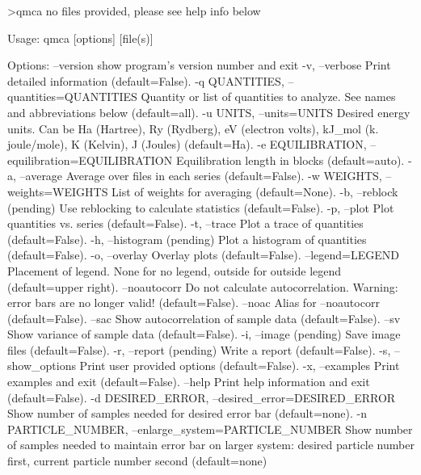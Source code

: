\begin{shade}
>qmca
  no files provided, please see help info below 
  
  Usage: qmca [options] [file(s)]
  
  Options:
    --version             show program's version number and exit
    -v, --verbose         Print detailed information (default=False).
    -q QUANTITIES, --quantities=QUANTITIES
                          Quantity or list of quantities to analyze.  See names
                          and abbreviations below (default=all).
    -u UNITS, --units=UNITS
                          Desired energy units.  Can be Ha (Hartree), Ry
                          (Rydberg), eV (electron volts), kJ_mol (k.
                          joule/mole), K (Kelvin), J (Joules) (default=Ha).
    -e EQUILIBRATION, --equilibration=EQUILIBRATION
                          Equilibration length in blocks (default=auto).
    -a, --average         Average over files in each series (default=False).
    -w WEIGHTS, --weights=WEIGHTS
                          List of weights for averaging (default=None).
    -b, --reblock         (pending) Use reblocking to calculate statistics
                          (default=False).
    -p, --plot            Plot quantities vs. series (default=False).
    -t, --trace           Plot a trace of quantities (default=False).
    -h, --histogram       (pending) Plot a histogram of quantities
                          (default=False).
    -o, --overlay         Overlay plots (default=False).
    --legend=LEGEND       Placement of legend.  None for no legend, outside for
                          outside legend (default=upper right).
    --noautocorr          Do not calculate autocorrelation. Warning: error bars
                          are no longer valid! (default=False).
    --noac                Alias for --noautocorr (default=False).
    --sac                 Show autocorrelation of sample data (default=False).
    --sv                  Show variance of sample data (default=False).
    -i, --image           (pending) Save image files (default=False).
    -r, --report          (pending) Write a report (default=False).
    -s, --show_options    Print user provided options (default=False).
    -x, --examples        Print examples and exit (default=False).
    --help                Print help information and exit (default=False).
    -d DESIRED_ERROR, --desired_error=DESIRED_ERROR
                          Show number of samples needed for desired error bar
                          (default=none).
    -n PARTICLE_NUMBER, --enlarge_system=PARTICLE_NUMBER
                          Show number of samples needed to maintain error bar on
                          larger system: desired particle number first, current
                          particle number second (default=none) 
\end{shade}


